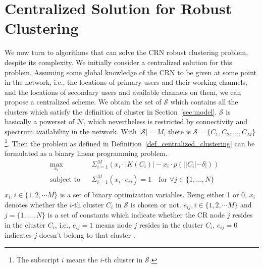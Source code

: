 \documentclass[times]{ettauth}
\newcommand{\ie}{i.e., }
\theoremstyle{mytheoremstyle}
\theoremstyle{mytheoremstyle}
\theoremstyle{mytheoremstyle}
\begin{document}
\section{Centralized Solution for Robust Clustering}
\label{centralized_solution}
We now turn to algorithms that can solve the CRN robust clustering problem, despite its complexity. 
We initially consider a centralized solution for this problem.
Assuming some global knowledge of the CRN to be given at some point in the network, \ie the locations of primary users and their working channels, and the locations of secondary users and available channels on them, we can propose a centralized scheme.
We obtain the set of $\mathcal{S}$ which contains all the clusters which satisfy the definition of cluster in Section~\ref{sec:model}.
$\mathcal{S}$ is basically a powerset of $\mathcal{N}$, which nevertheless is restricted by connectivity and spectrum availability in the network.
With $|\mathcal{S}| = M$, there is $\mathcal{S}=\{C_1, C_2, \ldots, C_M\}$ \footnote{The subscript $i$ means the $i$-th cluster in $\mathcal{S}$.}.
Then the problem as defined in Definition~\ref{def_centralized_clustering} can be formulated as a binary linear programming problem.
\begin{equation}
\begin{aligned}
     &\max\limits_{x_i} && \Sigma_{i=1}^M (x_i\cdot |K(C_i)| - x_i\cdot p(||C_i|-\delta|)) \\
     &\text{subject to}   && \Sigma_{i=1}^M (x_i\cdot e_{ij}) = 1  \quad\text{for}\,\,\forall j\in\{1, \ldots, N\} \\
\end{aligned}
\label{centralized_opt}
\end{equation}
$x_i, i\in \{1,2, \cdots M\}$ is a set of binary optimization variables.
Being either 1 or 0, $x_i$ denotes whether the $i$-th cluster $C_i$ in $\mathcal{S}$ is chosen or not.
$e_{ij}, i\in \{1,2, \cdots M\}$ and $j=\{1, \ldots, N\}$ is a set of constants which indicate whether the CR node $j$ resides in the cluster $C_i$, \ie $e_{ij}=1$ means node $j$ resides in the cluster $C_i$, $e_{ij}=0$ indicates $j$ doesn't belong to that cluster .
\end{document}
